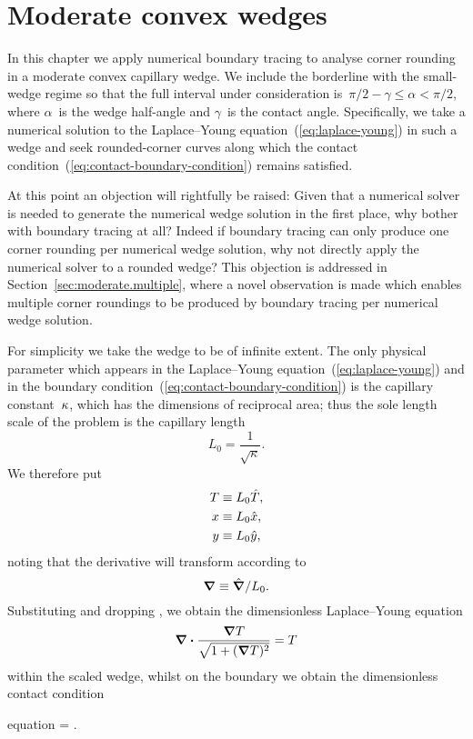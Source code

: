 \chapter{Moderate convex wedges}
\label{ch:moderate}

In this chapter
we apply numerical boundary tracing to analyse corner rounding
in a moderate convex capillary wedge.
We include the borderline with the small-wedge regime
so that the full interval under consideration
is~$\pi/2 - \gamma \le \alpha < \pi/2$,
where $\alpha$~is the wedge half-angle
and $\gamma$~is the contact angle.
Specifically, we take a numerical solution
to the Laplace--Young equation~(\ref{eq:laplace-young}) in such a wedge
and seek rounded-corner curves along which
the contact condition~(\ref{eq:contact-boundary-condition})
remains satisfied.

At this point an objection will rightfully be raised:
Given that a numerical solver is needed
to generate the numerical wedge solution in the first place,
why bother with boundary tracing at all?
Indeed if boundary tracing can only produce
one corner rounding per numerical wedge solution,
why not directly apply the numerical solver to a rounded wedge?
This objection is addressed
in Section~\ref{sec:moderate.multiple},
where a novel observation is made
which enables multiple corner roundings to be produced by boundary tracing
per numerical wedge solution.

\thematicbreak

For simplicity we take the wedge to be of infinite extent.
The only physical parameter which appears
in the Laplace--Young equation~(\ref{eq:laplace-young})
and in the boundary condition~(\ref{eq:contact-boundary-condition})
is the capillary constant~$\kappa$,
which has the dimensions of reciprocal area;
thus the sole length scale of the problem
is the capillary length
\begin{equation}
  L_0 = \frac{1}{\sqrt{\kappa}}.
  \label{eq:capillary-length}
\end{equation}
We therefore put
\begin{align}
  T &\equiv L_0 \hat{T}, \label{eq:capillary-height-scaling} \\
  x &\equiv L_0 \hat{x}, \label{eq:capillary-x-scaling} \\
  y &\equiv L_0 \hat{y}, \label{eq:capillary-y-scaling}
\end{align}
noting that the derivative will transform according to
\begin{equation}
  \mathop{}\!\boldsymbol{\mathbf{\nabla}} \equiv \mathop{}\!\hat{\mathop{}\!\boldsymbol{\mathbf{\nabla}}} / L_0.
  \label{eq:capillary-del-scaling}
\end{equation}
Substituting and dropping \scalingmarks,
we obtain the dimensionless Laplace--Young equation
\begin{equation}
  \mathop{}\!\boldsymbol{\mathbf{\nabla}} \boldsymbol{\cdot} \frac{\mathop{}\!\boldsymbol{\mathbf{\nabla}} T}{\sqrt{1 + (\mathop{}\!\boldsymbol{\mathbf{\nabla}} T)^2}} =  T
  \label{eq:scaled-laplace-young}
\end{equation}
within the scaled wedge,
whilst on the boundary we obtain the dimensionless contact condition
\begin{important}{equation}
  \normalvec \dotp {} = \cos\gamma.
  \label{eq:scaled-contact-boundary-condition}
\end{important}

